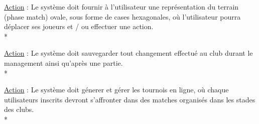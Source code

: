 \documentclass[a4paper]{article}
\begin{document}
\begin{description}[style=nextline]
\begin{description}[leftmargin=*]
			\end{description}
			\item[Représentation phase match :]
			\begin{description}[leftmargin=*] %
				\item[]
				\item \underline{Action} : Le système doit fournir à l'utilisateur une représentation du terrain (phase match) ovale, sous forme de cases hexagonales, où l'utilisateur pourra déplacer ses joueurs et / ou effectuer une action.\\*
			\end{description}
			\item[Sauvegarde :]
			\begin{description}[leftmargin=*] %
				\item[]
				\item \underline{Action} : Le système doit sauvegarder tout changement effectué au \gls{club} durant le management ainsi qu'après une partie.\\*
			\end{description}
			\item[Tournois :]
			\begin{description}[leftmargin=*] %
				\item[]
				\item \underline{Action} : Le système doit génerer et gérer les tournois en ligne, où chaque utilisateurs inscrits devront s'affronter dans des matches organisés dans les stades des clubs.\\*
			\end{description}
		\end{description}
\end{document}
